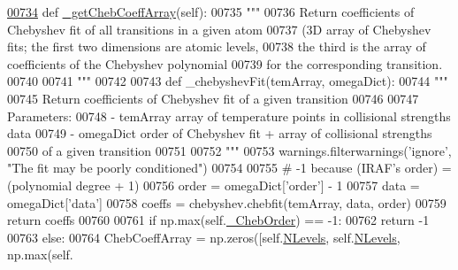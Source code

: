\begin{DoxyCode}
\hypertarget{classpyneb_1_1core_1_1pynebcore_1_1___coll_data_fits_l00734}{}\hyperlink{classpyneb_1_1core_1_1pynebcore_1_1___coll_data_fits_afe4a86564a0306ca1a72cfccc1a66360}{00734}     \textcolor{keyword}{def }\hyperlink{classpyneb_1_1core_1_1pynebcore_1_1___coll_data_fits_afe4a86564a0306ca1a72cfccc1a66360}{\_getChebCoeffArray}(self):
00735         \textcolor{stringliteral}{"""}
00736 \textcolor{stringliteral}{        Return coefficients of Chebyshev fit of all transitions in a given atom}
00737 \textcolor{stringliteral}{            (3D array of Chebyshev fits; the first two dimensions are atomic levels,}
00738 \textcolor{stringliteral}{            the third is the array of coefficients of the Chebyshev polynomial}
00739 \textcolor{stringliteral}{            for the corresponding transition.}
00740 \textcolor{stringliteral}{}
00741 \textcolor{stringliteral}{        """}
00742 
00743         \textcolor{keyword}{def }\_chebyshevFit(temArray, omegaDict):
00744             \textcolor{stringliteral}{"""}
00745 \textcolor{stringliteral}{            Return coefficients of Chebyshev fit of a given transition}
00746 \textcolor{stringliteral}{            }
00747 \textcolor{stringliteral}{            Parameters:}
00748 \textcolor{stringliteral}{                - temArray    array of temperature points in collisional strengths data}
00749 \textcolor{stringliteral}{                - omegaDict   order of Chebyshev fit + array of collisional strengths }
00750 \textcolor{stringliteral}{                                of a given transition}
00751 \textcolor{stringliteral}{}
00752 \textcolor{stringliteral}{            """}
00753             warnings.filterwarnings(\textcolor{stringliteral}{'ignore'}, \textcolor{stringliteral}{"The fit may be poorly conditioned"})
00754 
00755             \textcolor{comment}{# -1 because (IRAF's order) = (polynomial degree + 1)}
00756             order = omegaDict[\textcolor{stringliteral}{'order'}] - 1
00757             data = omegaDict[\textcolor{stringliteral}{'data'}]
00758             coeffs = chebyshev.chebfit(temArray, data, order)
00759             \textcolor{keywordflow}{return} coeffs
00760         
00761         \textcolor{keywordflow}{if} np.max(self.\hyperlink{classpyneb_1_1core_1_1pynebcore_1_1___coll_data_fits_aeb6a6f312ca21c1e1b3aa72225a0d442}{\_ChebOrder}) == -1:
00762             \textcolor{keywordflow}{return} -1
00763         \textcolor{keywordflow}{else}:
00764             ChebCoeffArray = np.zeros([self.\hyperlink{classpyneb_1_1core_1_1pynebcore_1_1___coll_data_fits_a64b97a86b4dfb53e4cba3ce8ac0fdf00}{NLevels}, self.\hyperlink{classpyneb_1_1core_1_1pynebcore_1_1___coll_data_fits_a64b97a86b4dfb53e4cba3ce8ac0fdf00}{NLevels}, np.max(self.

\end{DoxyCode}
